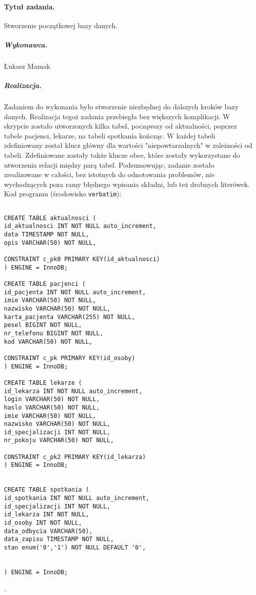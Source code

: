 \documentclass[a4paper]{article} \usepackage{polski} \usepackage[cp1250]{inputenc} \usepackage{url}
\begin{document}
\paragraph{Tytuł zadania.} Stworzenie początkowej bazy danych. \subparagraph{Wykonawca.} Łukasz Mamak \subparagraph{Realizacja.} Zadaniem do wykonania było stworzenie niezbędnej do dalszych kroków bazy danych. Realizacja tegoż zadania przebiegła bez większych komplikacji. W skrypcie zostało utworzonych kilka tabel, począwszy od aktualności, poprzez tabele pacjenci, lekarze, na tabeli spotkania kończąc. W każdej tabeli zdefiniowany został klucz główny dla wartości "niepowtarzalnych" w zależności od tabeli. Zdefiniowane zostały także klucze obce, które zostały wykorzystane do utworzenia relacji między parą tabel. Podsumowując, zadanie zostało zrealizowane w całości, bez istotnych do odnotowania problemów, nie wychodzących poza ramy błędnego wpisania składni, lub też drobnych literówek. 
\newline
\newline
    Kod programu (środowisko \texttt{verbatim}): \begin{verbatim}

CREATE TABLE aktualnosci (
id_aktualnosci INT NOT NULL auto_increment,
data TIMESTAMP NOT NULL,
opis VARCHAR(50) NOT NULL,

CONSTRAINT c_pk0 PRIMARY KEY(id_aktualnosci)
) ENGINE = InnoDB; 

CREATE TABLE pacjenci (
id_pacjenta INT NOT NULL auto_increment,
imie VARCHAR(50) NOT NULL,
nazwisko VARCHAR(50) NOT NULL,
karta_pacjenta VARCHAR(255) NOT NULL,
pesel BIGINT NOT NULL,
nr_telefonu BIGINT NOT NULL,
kod VARCHAR(50) NOT NULL,

CONSTRAINT c_pk PRIMARY KEY(id_osoby)
) ENGINE = InnoDB; 

CREATE TABLE lekarze (
id_lekarza INT NOT NULL auto_increment,
login VARCHAR(50) NOT NULL,
haslo VARCHAR(50) NOT NULL,
imie VARCHAR(50) NOT NULL,
nazwisko VARCHAR(50) NOT NULL,
id_specjalizacji INT NOT NULL,
nr_pokoju VARCHAR(50) NOT NULL,

CONSTRAINT c_pk2 PRIMARY KEY(id_lekarza)
) ENGINE = InnoDB; 


CREATE TABLE spotkania (
id_spotkania INT NOT NULL auto_increment,
id_specjalizacji INT NOT NULL,
id_lekarza INT NOT NULL,
id_osoby INT NOT NULL,
data_odbycia VARCHAR(50),
data_zapisu TIMESTAMP NOT NULL,
stan enum('0','1') NOT NULL DEFAULT '0',


) ENGINE = InnoDB; 

\end{verbatim}.
\end{document}
